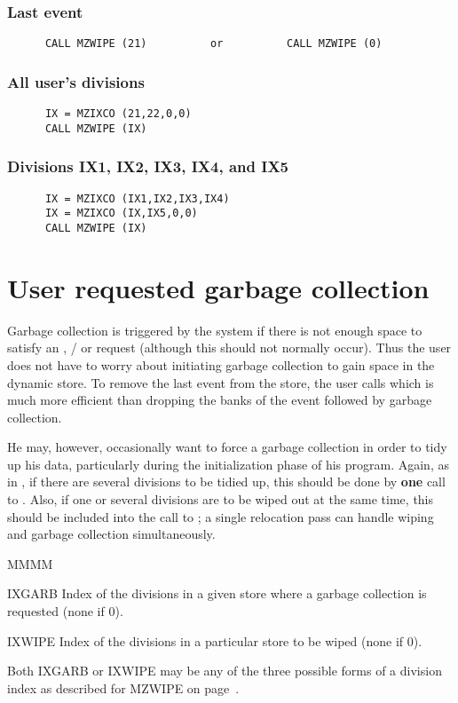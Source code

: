 \subsubsection{Last event}
\begin{verbatim}
      CALL MZWIPE (21)          or          CALL MZWIPE (0)
\end{verbatim}
\subsubsection{All user's divisions}
\begin{verbatim}
      IX = MZIXCO (21,22,0,0)
      CALL MZWIPE (IX)
\end{verbatim}
\subsubsection{Divisions IX1, IX2, IX3, IX4, and IX5}
\begin{verbatim}
      IX = MZIXCO (IX1,IX2,IX3,IX4)
      IX = MZIXCO (IX,IX5,0,0)
      CALL MZWIPE (IX)
\end{verbatim}
\section{User requested garbage collection}
\par Garbage collection is triggered by the system if there is not
enough space to satisfy an , / or 
 request (although this should not normally occur).
Thus the user does not have to worry about initiating
garbage collection to gain space in the dynamic store.
To remove the last event from the store,
the user calls  which is much more efficient
than dropping the banks of the event followed by garbage collection.
\par He may, however, occasionally want to force a garbage collection
in order to tidy up his data,
particularly during the initialization phase of his program.
Again, as in , if there are several divisions to be tidied up,
this should be done by {\bf one} call to . Also,
if one or several divisions are to be wiped out at the same time,
this should be included into the call to ;
a single relocation pass can handle wiping
and garbage collection simultaneously.
\Idesc
\begin{DL}{MMMM}
\item[IXGARB]Index of the divisions in a given store where a garbage collection
is requested (none if 0).
\item[IXWIPE]Index of the divisions in a particular store
to be wiped (none if 0).
\end{DL}
\par
Both IXGARB or IXWIPE may be any of the three possible forms
of a division index as described for MZWIPE on page~\pageref{SR_MZWIPE}.
